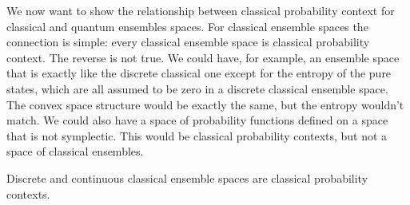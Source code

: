 We now want to show the relationship between classical probability context for classical and quantum ensembles spaces. For classical ensemble spaces the connection is simple: every classical ensemble space is classical probability context. The reverse is not true. We could have, for example, an ensemble space that is exactly like the discrete classical one except for the entropy of the pure states, which are all assumed to be zero in a discrete classical ensemble space. The convex space structure would be exactly the same, but the entropy wouldn't match. We could also have a space of probability functions defined on a space that is not symplectic. This would be classical probability contexts, but not a space of classical ensembles.

\begin{conj}
	Discrete and continuous classical ensemble spaces are classical probability contexts.
\end{conj}



